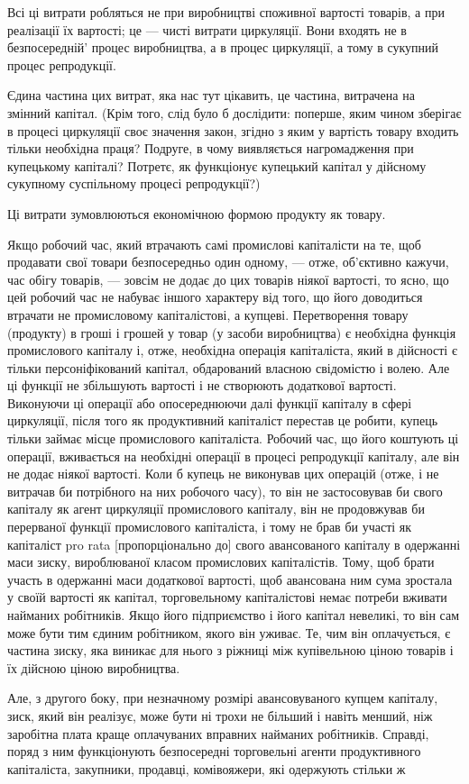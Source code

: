 Всі ці витрати робляться не при виробництві споживної вартості
товарів, а при реалізації їх вартості; це — чисті витрати
циркуляції. Вони входять не в безпосередній' процес виробництва,
а в процес циркуляції, а тому в сукупний процес репродукції.

Єдина частина цих витрат, яка нас тут цікавить, це частина,
витрачена на змінний капітал. (Крім того, слід було б дослідити:
поперше, яким чином зберігає в процесі циркуляції своє
значення закон, згідно з яким у вартість товару входить тільки
необхідна праця? Подруге, в чому виявляється нагромадження
при купецькому капіталі? Потретє, як функціонує купецький капітал
у дійсному сукупному суспільному процесі репродукції?)

Ці витрати зумовлюються економічною формою продукту як
товару.

Якщо робочий час, який втрачають самі промислові капіталісти
на те, щоб продавати свої товари безпосередньо один
одному, — отже, об’єктивно кажучи, час обігу товарів, — зовсім
не додає до цих товарів ніякої вартості, то ясно, що цей робочий
час не набуває іншого характеру від того, що його доводиться
втрачати не промисловому капіталістові, а купцеві. Перетворення
товару (продукту) в гроші і грошей у товар (у засоби
виробництва) є необхідна функція промислового капіталу і, отже,
необхідна операція капіталіста, який в дійсності є тільки персоніфікований
капітал, обдарований власною свідомістю і волею.
Але ці функції не збільшують вартості і не створюють додаткової
вартості. Виконуючи ці операції або опосереднюючи далі
функції капіталу в сфері циркуляції, після того як продуктивний
капіталіст перестав це робити, купець тільки займає місце
промислового капіталіста. Робочий час, що його коштують ці
операції, вживається на необхідні операції в процесі репродукції
капіталу, але він не додає ніякої вартості. Коли б купець
не виконував цих операцій (отже, і не витрачав би потрібного на
них робочого часу), то він не застосовував би свого капіталу
як агент циркуляції промислового капіталу, він не продовжував би
перерваної функції промислового капіталіста, і тому не брав би
участі як капіталіст pro rata [пропорціонально до] свого авансованого
капіталу в одержанні маси зиску, вироблюваної класом
промислових капіталістів. Тому, щоб брати участь в одержанні
маси додаткової вартості, щоб авансована ним сума зростала
у своїй вартості як капітал, торговельному капіталістові немає
потреби вживати найманих робітників. Якщо його підприємство
і його капітал невеликі, то він сам може бути тим єдиним робітником,
якого він уживає. Те, чим він оплачується, є частина
зиску, яка виникає для нього з ріжниці між купівельною ціною
товарів і їх дійсною ціною виробництва.

Але, з другого боку, при незначному розмірі авансовуваного
купцем капіталу, зиск, який він реалізує, може бути ні трохи
не більший і навіть менший, ніж заробітна плата краще оплачуваних
вправних найманих робітників. Справді, поряд з ним функціонують
безпосередні торговельні агенти продуктивного капіталіста,
закупники, продавці, комівояжери, які одержують стільки ж
\parbreak{}  %
